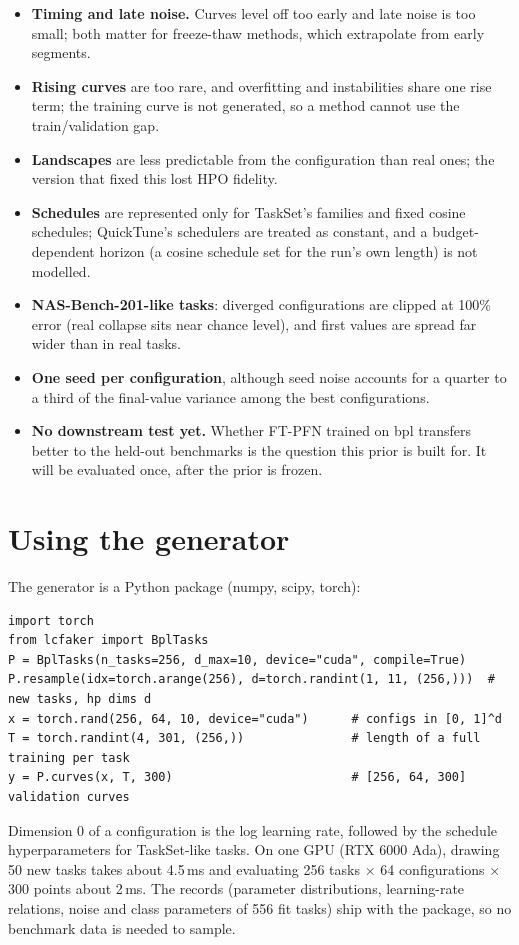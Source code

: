 \documentclass[10pt]{article}
\newcommand{\bpl}{\textsf{bpl}}
\begin{document}
\begin{itemize}
  \item \textbf{Timing and late noise.} Curves level off too early and late noise is too small; both matter for
    freeze-thaw methods, which extrapolate from early segments.
  \item \textbf{Rising curves} are too rare, and overfitting and instabilities share one rise term; the training
    curve is not generated, so a method cannot use the train/validation gap.
  \item \textbf{Landscapes} are less predictable from the configuration than real ones; the version that fixed this
    lost HPO fidelity.
  \item \textbf{Schedules} are represented only for TaskSet's families and fixed cosine schedules; QuickTune's
    schedulers are treated as constant, and a budget-dependent horizon (a cosine schedule set for the run's own
    length) is not modelled.
  \item \textbf{NAS-Bench-201-like tasks}: diverged configurations are clipped at 100\% error (real collapse sits near
    chance level), and first values are spread far wider than in real tasks.
  \item \textbf{One seed per configuration}, although seed noise accounts for a quarter to a third of the
    final-value variance among the best configurations.
  \item \textbf{No downstream test yet.} Whether FT-PFN trained on \bpl{} transfers better to the held-out benchmarks
    is the question this prior is built for. It will be evaluated once, after the prior is frozen.
\end{itemize}

\section{Using the generator}

The generator is a Python package (numpy, scipy, torch):
\begin{verbatim}
import torch
from lcfaker import BplTasks
P = BplTasks(n_tasks=256, d_max=10, device="cuda", compile=True)
P.resample(idx=torch.arange(256), d=torch.randint(1, 11, (256,)))  # new tasks, hp dims d
x = torch.rand(256, 64, 10, device="cuda")      # configs in [0, 1]^d
T = torch.randint(4, 301, (256,))               # length of a full training per task
y = P.curves(x, T, 300)                         # [256, 64, 300] validation curves
\end{verbatim}
Dimension 0 of a configuration is the log learning rate, followed by the schedule hyperparameters for TaskSet-like
tasks. On one GPU (RTX 6000 Ada), drawing 50 new tasks takes about 4.5\,ms and evaluating 256 tasks $\times$ 64
configurations $\times$ 300 points about 2\,ms. The records (parameter distributions, learning-rate relations, noise
and class parameters of 556 fit tasks) ship with the package, so no benchmark data is needed to sample.
\end{document}
